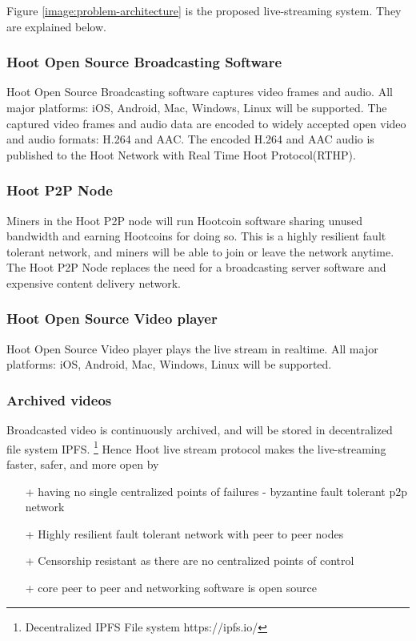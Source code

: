 \documentclass{article}
\begin{document}
Figure \ref{image:problem-architecture} is the proposed live-streaming system. They are explained below.
\subsubsection{Hoot Open Source Broadcasting Software}
Hoot Open Source Broadcasting software captures video frames and audio. All major platforms: iOS, Android, Mac, Windows, Linux will be supported. The captured video frames and audio data are encoded to widely accepted open video and audio formats: H.264 and AAC. The encoded H.264 and AAC audio is published to the Hoot Network with Real Time Hoot Protocol(RTHP).

\subsubsection{Hoot P2P Node}
Miners in the Hoot P2P node will run Hootcoin software sharing unused bandwidth and earning Hootcoins for doing so. This is a highly resilient fault tolerant network, and miners will be able to join or leave the network anytime. The Hoot P2P Node replaces the need for a broadcasting server software and expensive content delivery network.

\subsubsection{Hoot Open Source Video player}
Hoot Open Source Video player plays the live stream in realtime. All major platforms: iOS, Android, Mac, Windows, Linux will be supported.

\subsubsection{Archived videos}
Broadcasted video is continuously archived, and will be stored in decentralized file system IPFS. \footnote{Decentralized IPFS File system https://ipfs.io/} Hence Hoot live stream protocol makes the live-streaming faster, safer, and more open by
\begin{itemize}
 \item[+]having no single centralized points of failures - byzantine fault tolerant p2p network
 \item[+]Highly resilient fault tolerant network with peer to peer nodes
 \item[+]Censorship resistant as there are no centralized points of control
 \item[+]core peer to peer and networking software is open source
\end{itemize}
\end{document}
